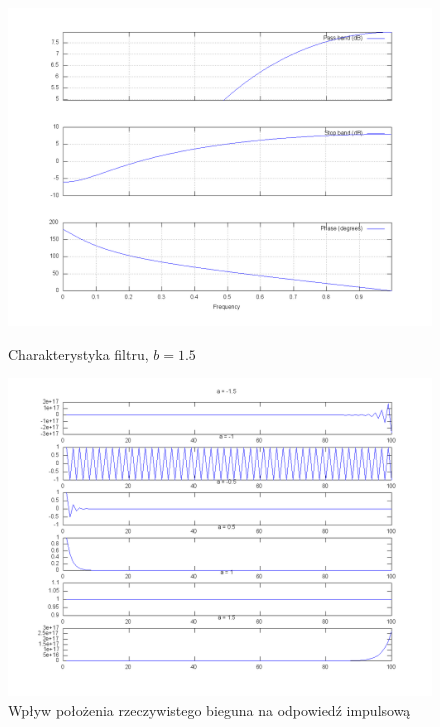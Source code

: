 \documentclass[wide,a4paper,titlepage,12pt]{mwart}
\begin{document}
  \begin{figure}[htbp]
    \begin{center}
      \includegraphics[scale=.3]{out/fig7.png}
      \caption{\label{fig7} Charakterystyka filtru, $b=1.5$}
      \includegraphics[scale=.3]{out/fig8.png}
      \caption{\label{fig8} Wpływ położenia rzeczywistego bieguna na odpowiedź impulsową}

    \end{center}
  \end{figure}
\end{document}
